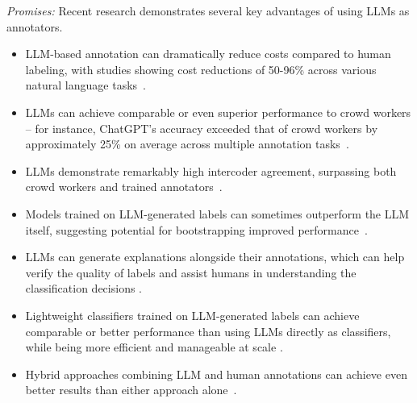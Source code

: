 \documentclass[11pt]{article}
\begin{document}
\emph{Promises:} Recent research demonstrates several key advantages of using LLMs as annotators. 
\begin{itemize}
    \item  LLM-based annotation can dramatically reduce costs compared to human labeling, with studies showing cost reductions of 50-96\% across various natural language tasks~\cite{DBLP:conf/emnlp/WangLXZZ21}. 
    \item LLMs can achieve comparable or even superior performance to crowd workers -- for instance, ChatGPT's accuracy exceeded that of crowd workers by approximately 25\% on average across multiple annotation tasks~\cite{DBLP:journals/corr/abs-2303-15056}. 
    \item LLMs demonstrate remarkably high intercoder agreement, surpassing both crowd workers and trained annotators~\cite{DBLP:journals/corr/abs-2303-15056}. 
    \item Models trained on LLM-generated labels can sometimes outperform the LLM itself, suggesting potential for bootstrapping improved performance~\cite{DBLP:conf/emnlp/WangLXZZ21}. 
    \item LLMs can generate explanations alongside their annotations, which can help verify the quality of labels and assist humans in understanding the classification decisions \cite{DBLP:conf/chi/Wang0RMM24}. 
    \item Lightweight classifiers trained on LLM-generated labels can achieve comparable or better performance than using LLMs directly as classifiers, while being more efficient and manageable at scale \cite{DBLP:conf/kdd/WanSJKCNSSWYABJ24}. 
    \item Hybrid approaches combining LLM and human annotations can achieve even better results than either approach alone~\cite{DBLP:conf/emnlp/WangLXZZ21}.
\end{itemize}
\end{document}
